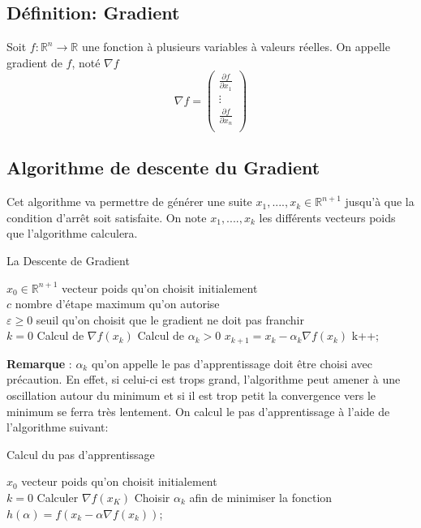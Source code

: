 \documentclass{article}
\begin{document}
\subsection{Définition: Gradient}
		Soit $f: \mathbb{R}^{n} \to \mathbb{R}$ une fonction à plusieurs variables à valeurs réelles. On appelle gradient de $f$, noté $\nabla f$
		\[ \nabla f= \begin{pmatrix} 
					\frac{\partial f}{\partial x_1} \\
					\vdots\\	
					\frac{\partial f}{\partial x_n}\\
				 \end{pmatrix} \] 

\subsection{Algorithme de descente du Gradient}
 	
	Cet algorithme va permettre de générer une suite  $x_{1},....,x_{k} \in \mathbb{R}^{n+1}$ jusqu'à que la condition d'arrêt soit satisfaite. On note $x_{1},....,x_{k}$ les différents vecteurs poids que l'algorithme calculera.
	
\begin{algorithm}
	\caption{La Descente de Gradient}
	\begin{algorithmic}
	\REQUIRE $x_{0} \in \mathbb{R}^{n+1}$ vecteur poids qu'on choisit initialement \\ 
	$c$ nombre d'étape maximum qu'on autorise  \\ %
	$\varepsilon \ge 0$ seuil qu'on choisit que le gradient ne doit pas franchir \\ 
	$k=0$
		\STATE Calcul de $\nabla f(x_{k})$ \; %
		\STATE Calcul de $\alpha_{k} > 0 $ \;
		\STATE $ x_{k+1} = x_{k} - \alpha_{k} \nabla f(x_{k}) $ \;
		\STATE k++; 
	\ENDWHILE
	\end{algorithmic}
	\end{algorithm} 
\textbf{Remarque }: $\alpha_{k}$ qu'on appelle le pas d'apprentissage doit être choisi avec précaution. En effet, si celui-ci est trops grand, l'algorithme peut amener à une oscillation autour du minimum et si il est trop petit la convergence vers le minimum se ferra très lentement. 
On calcul le pas d'apprentissage à l'aide de l'algorithme suivant: 
	\begin{algorithm}
	\caption{Calcul du pas d'apprentissage}
	\begin{algorithmic}
	\REQUIRE $x_{0}$ vecteur poids qu'on choisit initialement \\ 
	$k=0$
	\STATE Calculer $\nabla f(x_{K})$ \; 
	\STATE Choisir $\alpha_{k}$ afin de minimiser la fonction $h(\alpha) = f(x_{k}-\alpha \nabla f(x_{k}))$;
	\end{algorithmic}
	\end{algorithm} 
\end{document}
